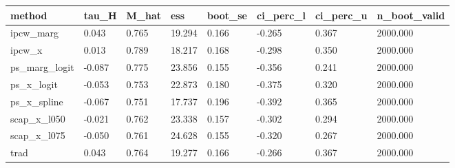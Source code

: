 \begin{tabular}{llllllll}
\hline
method & tau_H & M_hat & ess & boot_se & ci_perc_l & ci_perc_u & n_boot_valid \\
\hline
ipcw_marg & 0.043 & 0.765 & 19.294 & 0.166 & -0.265 & 0.367 & 2000.000 \\
ipcw_x & 0.013 & 0.789 & 18.217 & 0.168 & -0.298 & 0.350 & 2000.000 \\
ps_marg_logit & -0.087 & 0.775 & 23.856 & 0.155 & -0.356 & 0.241 & 2000.000 \\
ps_x_logit & -0.053 & 0.753 & 22.873 & 0.180 & -0.375 & 0.320 & 2000.000 \\
ps_x_spline & -0.067 & 0.751 & 17.737 & 0.196 & -0.392 & 0.365 & 2000.000 \\
scap_x_l050 & -0.021 & 0.762 & 23.338 & 0.157 & -0.302 & 0.294 & 2000.000 \\
scap_x_l075 & -0.050 & 0.761 & 24.628 & 0.155 & -0.320 & 0.267 & 2000.000 \\
trad & 0.043 & 0.764 & 19.277 & 0.166 & -0.266 & 0.367 & 2000.000 \\
\hline
\end{tabular}
